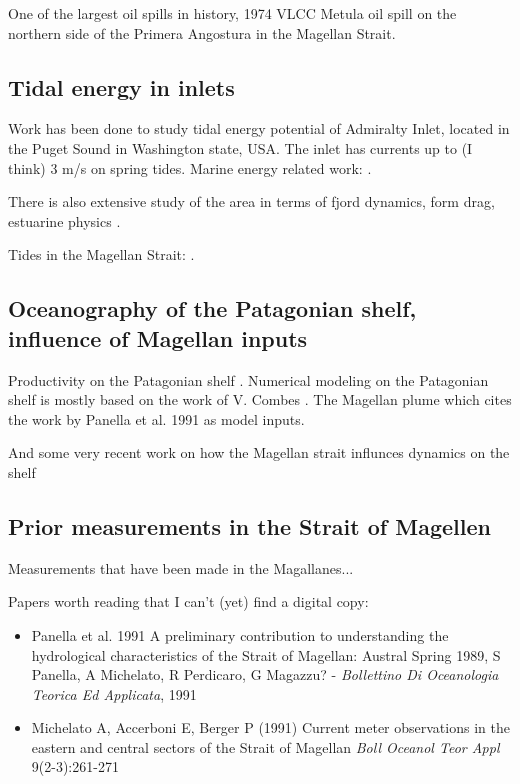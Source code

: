 \documentclass[11pt, oneside]{article}   	%
\begin{document}
One of the largest oil spills in history, 1974 VLCC Metula oil spill on the northern side of the Primera Angostura in the Magellan Strait. 

\citep{iriarte18}

\subsection*{Tidal energy in inlets}

Work has been done to study tidal energy potential of Admiralty Inlet, located in the Puget Sound in Washington state, USA. The inlet has currents up to (I think) 3 m/s on spring tides. Marine energy related work: \citep{polagye13, kawasethyng10, thomson12, polagye09}. 

There is also extensive study of the area in terms of fjord dynamics, form drag, estuarine physics \citep[e.g.][]{warner13, geyer82}.


Tides in the Magellan Strait: \citep{conteras04, medeiros88}.

\subsection*{Oceanography of the Patagonian shelf, influence of Magellan inputs}
Productivity on the Patagonian shelf \citep{song16}. Numerical modeling on the Patagonian shelf is mostly based on the work of V. Combes \citep{combes14}. The Magellan plume \citep{palma12} which cites the work by Panella et al. 1991 as model inputs.

And some very recent work on how the Magellan strait influnces dynamics on the shelf \citep{guihou20, brun20}


\subsection*{Prior measurements in the Strait of Magellen}
Measurements that have been made in the Magallanes... \citep{antezana99}

Papers worth reading that I can't (yet) find a digital copy: 

\begin{itemize}
\item Panella et al. 1991 A preliminary contribution to understanding the hydrological characteristics of the Strait of Magellan: Austral Spring 1989, S Panella, A Michelato, R Perdicaro, G Magazzu? - \textit{Bollettino Di Oceanologia Teorica Ed Applicata}, 1991

\item Michelato A, Accerboni E, Berger P (1991) Current meter observations in the eastern and central sectors of the Strait of Magellan \textit{Boll Oceanol Teor Appl} 9(2-3):261-271
\end{itemize}
\end{document}
